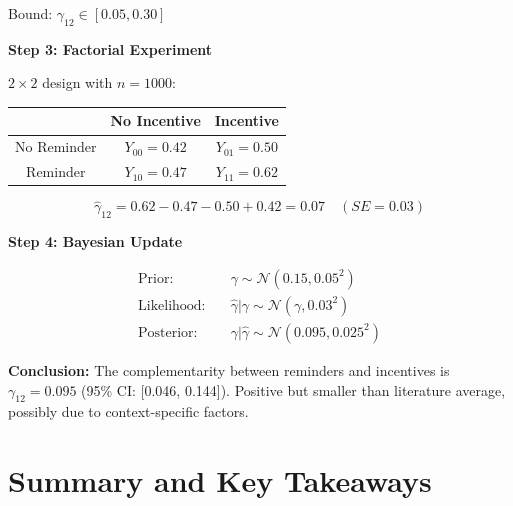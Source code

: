 Bound: $\gamma_{12} \in [0.05, 0.30]$

\textbf{Step 3: Factorial Experiment}

$2 \times 2$ design with $n = 1000$:
\begin{center}
\begin{tabular}{c|cc}
& No Incentive & Incentive \\
\hline
No Reminder & $Y_{00} = 0.42$ & $Y_{01} = 0.50$ \\
Reminder & $Y_{10} = 0.47$ & $Y_{11} = 0.62$
\end{tabular}
\end{center}

\begin{equation}
\hat{\gamma}_{12} = 0.62 - 0.47 - 0.50 + 0.42 = 0.07 \quad (SE = 0.03)
\end{equation}

\textbf{Step 4: Bayesian Update}

\begin{align}
\text{Prior:} & \quad \gamma \sim \mathcal{N}(0.15, 0.05^2) \\
\text{Likelihood:} & \quad \hat{\gamma} | \gamma \sim \mathcal{N}(\gamma, 0.03^2) \\
\text{Posterior:} & \quad \gamma | \hat{\gamma} \sim \mathcal{N}(0.095, 0.025^2)
\end{align}

\textbf{Conclusion:} The complementarity between reminders and incentives is $\gamma_{12} = 0.095$ (95\% CI: [0.046, 0.144]). Positive but smaller than literature average, possibly due to context-specific factors.

\section{Summary and Key Takeaways}
\label{sec:summary}

